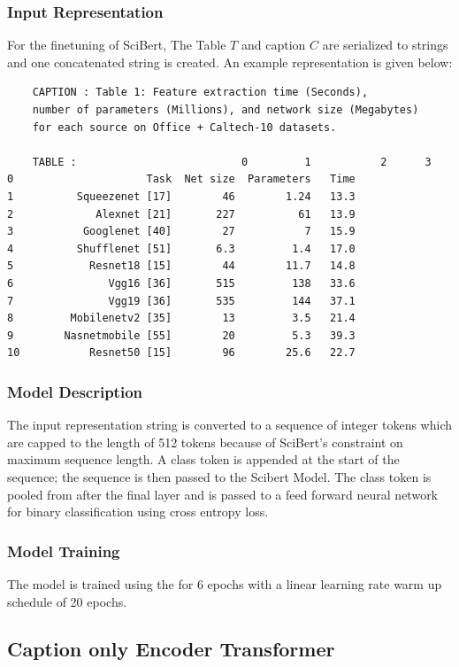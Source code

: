 \subsubsection{Input Representation}
\label{table_classification:models:sb:input_rep}
For the finetuning of SciBert, The Table $T$ and caption $C$ are serialized to strings and one concatenated string is created. An example representation is given below: 
\begin{verbatim}
    CAPTION : Table 1: Feature extraction time (Seconds), 
    number of parameters (Millions), and network size (Megabytes) 
    for each source on Office + Caltech-10 datasets.

    TABLE :                          0         1           2      3
0                     Task  Net size  Parameters   Time
1          Squeezenet [17]        46        1.24   13.3
2             Alexnet [21]       227          61   13.9
3           Googlenet [40]        27           7   15.9
4          Shufflenet [51]       6.3         1.4   17.0
5            Resnet18 [15]        44        11.7   14.8
6               Vgg16 [36]       515         138   33.6
7               Vgg19 [36]       535         144   37.1
8         Mobilenetv2 [35]        13         3.5   21.4
9        Nasnetmobile [55]        20         5.3   39.3
10           Resnet50 [15]        96        25.6   22.7
\end{verbatim}

\subsubsection{Model Description}
The input representation string is converted to a sequence of integer tokens which are capped to the length of 512 tokens because of SciBert's constraint on maximum sequence length. A class token is appended at the start of the sequence; the sequence is then passed to the Scibert Model. The class token is pooled from after the final layer and is passed to a feed forward neural network for binary classification using cross entropy loss. 


\subsubsection{Model Training}
The model is trained using the for 6 epochs with a linear learning rate warm up schedule of 20 epochs.

\subsection{Caption only Encoder Transformer}

